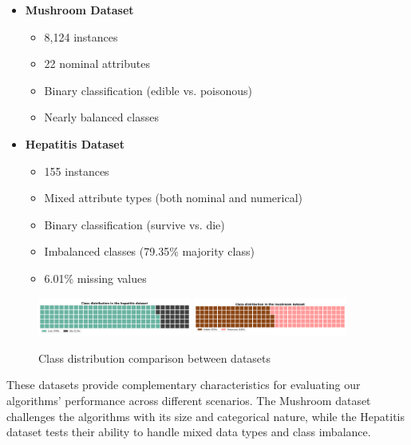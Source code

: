 \begin{itemize}
    \item \textbf{Mushroom Dataset}
    \begin{itemize}
        \item 8,124 instances
        \item 22 nominal attributes
        \item Binary classification (edible vs. poisonous)
        \item Nearly balanced classes
    \end{itemize}
    
    \item \textbf{Hepatitis Dataset}
    \begin{itemize}
        \item 155 instances
        \item Mixed attribute types (both nominal and numerical)
        \item Binary classification (survive vs. die)
        \item Imbalanced classes (79.35\% majority class)
        \item 6.01\% missing values
    \end{itemize}
\end{itemize}

\begin{figure}
    \centering
    \includegraphics[width=0.45\textwidth]{figures/hepatitis-class-distribution.png}
    \includegraphics[width=0.45\textwidth]{figures/mushroom-class-distribution.png}
    \caption{Class distribution comparison between datasets}
    \label{fig:class-distributions}
\end{figure}

These datasets provide complementary characteristics for evaluating our algorithms' performance across different scenarios. The Mushroom dataset challenges the algorithms with its size and categorical nature, while the Hepatitis dataset tests their ability to handle mixed data types and class imbalance.
